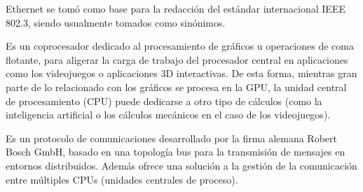 \begin{description}[style=multiline, leftmargin=4cm]
  \par Ethernet se tomó como base para la redacción del estándar internacional IEEE 802.3, siendo usualmente tomados como sinónimos.
  \item[\textbf{Graphics Processor Unit (GPU):}] Es un coprocesador dedicado al procesamiento de gráficos u operaciones de coma flotante, para aligerar la carga de trabajo del procesador central en aplicaciones como los videojuegos o aplicaciones 3D interactivas. De esta forma, mientras gran parte de lo relacionado con los gráficos se procesa en la GPU, la unidad central de procesamiento (CPU) puede dedicarse a otro tipo de cálculos (como la inteligencia artificial o los cálculos mecánicos en el caso de los videojuegos).
  \item[\textbf{Bus CAN:}] Es un protocolo de comunicaciones desarrollado por la firma alemana Robert Bosch GmbH, basado en una topología bus para la transmisión de mensajes en entornos distribuidos. Además ofrece una solución a la gestión de la comunicación entre múltiples CPUs (unidades centrales de proceso).

\end{description}

